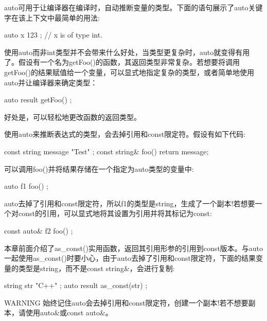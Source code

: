 auto可用于让编译器在编译时，自动推断变量的类型。下面的语句展示了auto关键字在该上下文中最简单的用法:

\begin{cpp}
auto x { 123 }; // x is of type int.
\end{cpp}

使用auto而非int类型并不会带来什么好处，当类型更复杂时，auto就变得有用了。假设有一个名为getFoo()的函数，其返回类型非常复杂。若想要将调用getFoo()的结果赋值给一个变量，可以显式地指定复杂的类型，或者简单地使用auto并让编译器来确定类型：

\begin{cpp}
auto result { getFoo() };
\end{cpp}

好处是，可以轻松地更改函数的返回类型。


使用auto来推断表达式的类型，会去掉引用和const限定符。假设有如下代码:

\begin{cpp}
const string message { "Test" };
const string& foo() { return message; }
\end{cpp}

可以调用foo()并将结果存储在一个指定为auto类型的变量中:

\begin{cpp}
auto f1 { foo() };
\end{cpp}

auto去掉了引用和const限定符，所以f1的类型是string，生成了一个副本!若想要一个对const的引用，可以显式地将其设置为引用并将其标记为const:

\begin{cpp}
const auto& f2 { foo() };
\end{cpp}

本章前面介绍了as\_const()实用函数，返回其引用形参的引用到const版本。与auto一起使用as\_const()时要小心，由于auto去掉了引用和const限定符，下面的结果变量的类型是string，而不是const string\&，会进行复制:

\begin{cpp}
string str { "C++" };
auto result { as_const(str) };
\end{cpp}

\begin{myWarning}{WARNING}
始终记住auto会去掉引用和const限定符，创建一个副本!若不想要副本，请使用auto\&或const auto\&。
\end{myWarning}


